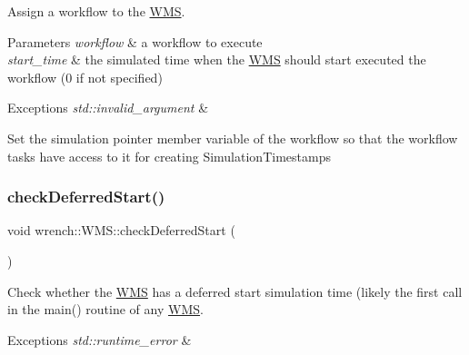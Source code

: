Assign a workflow to the \hyperlink{classwrench_1_1_w_m_s}{W\+MS}. 


\begin{DoxyParams}{Parameters}
{\em workflow} & a workflow to execute \\
\hline
{\em start\+\_\+time} & the simulated time when the \hyperlink{classwrench_1_1_w_m_s}{W\+MS} should start executed the workflow (0 if not specified)\\
\hline
\end{DoxyParams}

\begin{DoxyExceptions}{Exceptions}
{\em std\+::invalid\+\_\+argument} & \\
\hline
\end{DoxyExceptions}
Set the simulation pointer member variable of the workflow so that the workflow tasks have access to it for creating Simulation\+Timestamps\mbox{\label{classwrench_1_1_w_m_s_ac264b461c6f5900b96a1c9e33f7f4d58}} 
\subsubsection{\texorpdfstring{check\+Deferred\+Start()}{checkDeferredStart()}}
{\footnotesize\ttfamily void wrench\+::\+W\+M\+S\+::check\+Deferred\+Start (\begin{DoxyParamCaption}{ }\end{DoxyParamCaption})\hspace{0.3cm}{\ttfamily [protected]}}



Check whether the \hyperlink{classwrench_1_1_w_m_s}{W\+MS} has a deferred start simulation time (likely the first call in the main() routine of any \hyperlink{classwrench_1_1_w_m_s}{W\+MS}. 


\begin{DoxyExceptions}{Exceptions}
{\em std\+::runtime\+\_\+error} & \\
\hline
\end{DoxyExceptions}
\mbox{\label{classwrench_1_1_w_m_s_aaf8902aadfd0542509cd0cae5519bcf3}} 
